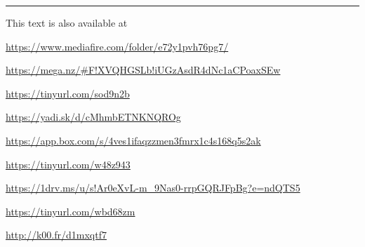 \documentclass[parskip=half,fontsize=12pt]{scrartcl}%
\begin{document}
\hrule\bigskip

This text is also available at 

\href{https://www.mediafire.com/folder/e72y1pvh76pg7/}{https://www.mediafire.com/folder/e72y1pvh76pg7/}

\href{https://mega.nz/#F!XVQHGSLb!iUGzAsdR4dNc1aCPoaxSEw}{https://mega.nz/\#F!XVQHGSLb!iUGzAsdR4dNc1aCPoaxSEw}

\href{https://tinyurl.com/sod9n2b}{https://tinyurl.com/sod9n2b}

\href{https://yadi.sk/d/cMhmbETNKNQROg}{https://yadi.sk/d/cMhmbETNKNQROg}

\href{https://app.box.com/s/4ves1ifaqzzmen3fmrx1c4s168q5s2ak}{https://app.box.com/s/4ves1ifaqzzmen3fmrx1c4s168q5s2ak}

\href{https://tinyurl.com/w48z943}{https://tinyurl.com/w48z943}

\href{https://1drv.ms/u/s!Ar0eXvL-m_9Nas0-rrpGQRJFpBg?e=ndQTS5}{https://1drv.ms/u/s!Ar0eXvL-m\_9Nas0-rrpGQRJFpBg?e=ndQTS5}

\href{https://tinyurl.com/wbd68zm}{https://tinyurl.com/wbd68zm}

\href{http://k00.fr/d1mxqtf7}{http://k00.fr/d1mxqtf7}
\end{document}
